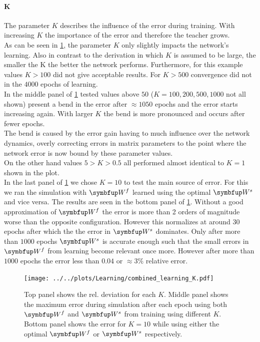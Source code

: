 \paragraph{K}
The parameter $K$ describes the influence of the error during training. With increasing $K$ the importance of the error and therefore the teacher grows.\\
As can be seen in \cref{fig:combined_learning_K}, the parameter $K$ only slightly impacts the network's learning. Also in contrast to the derivation in which $K$ is assumed to be large, the smaller the K the better the network performs. Furthermore, for this example values $K>100$ did not give acceptable results. For $K>500$ convergence did not in the $4000$ epochs of learning.\\
In the middle panel of \cref{fig:combined_learning_K} tested values above $50$ ($K = 100, 200,500,1000$ not all shown) present a bend in the error after $\approx 1050$ epochs and the error starts increasing again. With larger $K$ the bend is more pronounced and occurs after fewer epochs.\\
The bend is caused by the error gain having to much influence over the network dynamics, overly correcting errors in matrix parameters to the point where the network error is now bound by these parameter values.\\
On the other hand values $5>K>0.5$ all performed almost identical to $K=1$ shown in the plot.\\
In the last panel of \cref{fig:combined_learning_K} we chose $K=10$ to test the main source of error. For this we ran the simulation with $\bmu{W}^f$ learned using the optimal $\bmu{W}^s$ and vice versa. The results are seen in the bottom panel of \cref{fig:combined_learning_K}. Without a good approximation of $\bmu{W}^f$ the error is more than 2 orders of magnitude worse than the opposite configuration. However this normalizes at around $30$ epochs after which the the error in $\bmu{W}^s$ dominates. Only after more than $1000$ epochs $\bmu{W}^s$ is accurate enough such that the small errors in $\bmu{W}^f$ from learning become relevant once more. However after more than $1000$ epochs the error less than $0.04$ or $\approx 3\%$ relative error.\\
\begin{figure}
	\centering
	\texttt{[image: ../../plots/Learning/combined\_learning\_K.pdf]}
	\caption{Top panel shows the rel. deviation for each $K$. Middle panel shows the maximum error during simulation after each epoch using both $\bmu{W}^f$ and $\bmu{W}^s$ from training using different $K$. Bottom panel shows the error for $K = 10$ while using either the optimal $\bmu{W}^f$ or $\bmu{W}^s$ respectively.}
	\label{fig:combined_learning_K}
\end{figure}

